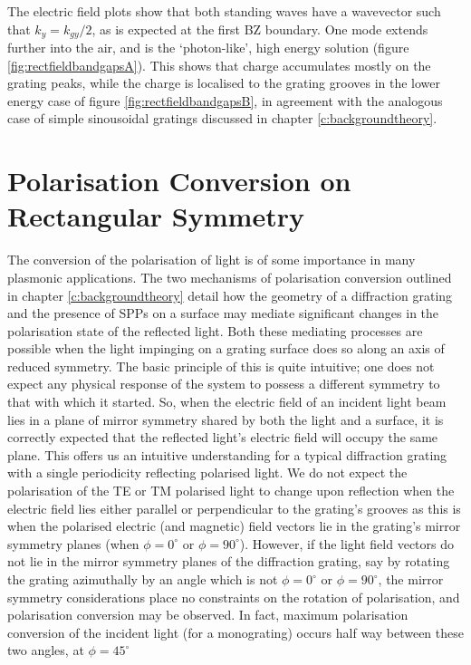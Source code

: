 The electric field plots show that both standing waves have a wavevector such that $k_y=k_{gy}/2$, as is expected at the first BZ boundary. One mode extends further into the air, and is the `photon-like', high energy solution (figure \ref{fig:rectfieldbandgapsA}). This shows that charge accumulates mostly on the grating peaks, while the charge is localised  to the grating grooves in the lower energy case of figure \ref{fig:rectfieldbandgapsB}, in agreement with the analogous case of simple sinousoidal gratings discussed in chapter \ref{c:backgroundtheory}. 

\section{Polarisation Conversion on Rectangular Symmetry\label{s:rpol}}

The conversion of the polarisation of  light is of some importance in many plasmonic applications. The two mechanisms of polarisation conversion outlined in chapter \ref{c:backgroundtheory} detail how the geometry of a diffraction grating and the presence of SPPs on a surface may mediate significant changes in the polarisation state of the reflected light. Both these mediating processes are possible when the light impinging on a grating surface does so along an axis of reduced symmetry. The basic principle of this is quite intuitive; one does not expect any physical response of the system to possess a different symmetry to that with which it started. So, when the electric field of an incident light beam lies in a plane of mirror symmetry shared by both the light and a surface, it is correctly expected that the reflected light's electric field will occupy the same plane. This offers us an intuitive understanding for a typical diffraction grating with a single periodicity reflecting polarised light. We do not expect the polarisation of the TE or TM polarised light to change upon reflection when the electric field lies either parallel or perpendicular to the grating's grooves as this is when the polarised electric (and magnetic) field vectors lie in the grating's mirror symmetry planes (when $\phi=0^\circ$ or $\phi=90^\circ$). However, if the light field vectors do not lie in the mirror symmetry planes of the diffraction grating, say by rotating the grating azimuthally by an angle which is not $\phi=0^\circ$ or $\phi=90^\circ$, the mirror symmetry considerations place no constraints on the rotation of polarisation, and polarisation conversion may be observed. In fact, maximum polarisation conversion of the incident light (for a monograting) occurs half way between these two angles, at $\phi=45^\circ$

